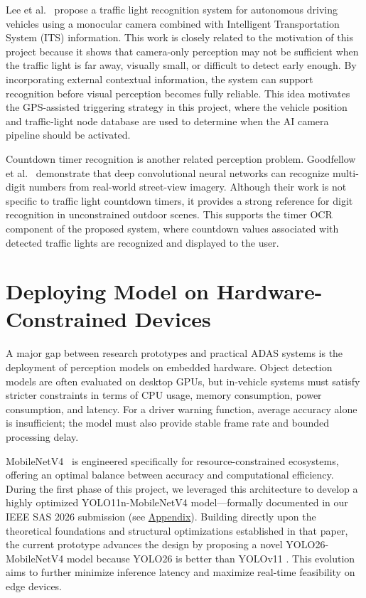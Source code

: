 Lee et al.~\cite{Lee2022TrafficLightRecognition} propose a traffic light recognition system for autonomous driving vehicles using a monocular camera combined with Intelligent Transportation System (ITS) information. This work is closely related to the motivation of this project because it shows that camera-only perception may not be sufficient when the traffic light is far away, visually small, or difficult to detect early enough. By incorporating external contextual information, the system can support recognition before visual perception becomes fully reliable. This idea motivates the GPS-assisted triggering strategy in this project, where the vehicle position and traffic-light node database are used to determine when the AI camera pipeline should be activated.

Countdown timer recognition is another related perception problem. Goodfellow et al.~\cite{goodfellow2014multidigitnumberrecognitionstreet} demonstrate that deep convolutional neural networks can recognize multi-digit numbers from real-world street-view imagery. Although their work is not specific to traffic light countdown timers, it provides a strong reference for digit recognition in unconstrained outdoor scenes. This supports the timer OCR component of the proposed system, where countdown values associated with detected traffic lights are recognized and displayed to the user.

\section{Deploying Model on Hardware-Constrained Devices}

A major gap between research prototypes and practical ADAS systems is the deployment of perception models on embedded hardware. Object detection models are often evaluated on desktop GPUs, but in-vehicle systems must satisfy stricter constraints in terms of CPU usage, memory consumption, power consumption, and latency. For a driver warning function, average accuracy alone is insufficient; the model must also provide stable frame rate and bounded processing delay.

MobileNetV4~\cite{qin2024mobilenetv4universalmodels} is engineered specifically for resource-constrained ecosystems, offering an optimal balance between accuracy and computational efficiency. During the first phase of this project, we leveraged this architecture to develop a highly optimized YOLO11n-MobileNetV4 model---formally documented in our IEEE SAS 2026 submission (see \hyperref[chap:append]{Appendix}). Building directly upon the theoretical foundations and structural optimizations established in that paper, the current prototype advances the design by proposing a novel {YOLO26-MobileNetV4} model because YOLO26 is better than YOLOv11 \cite{yolo26}. This evolution aims to further minimize inference latency and maximize real-time feasibility on edge devices.

